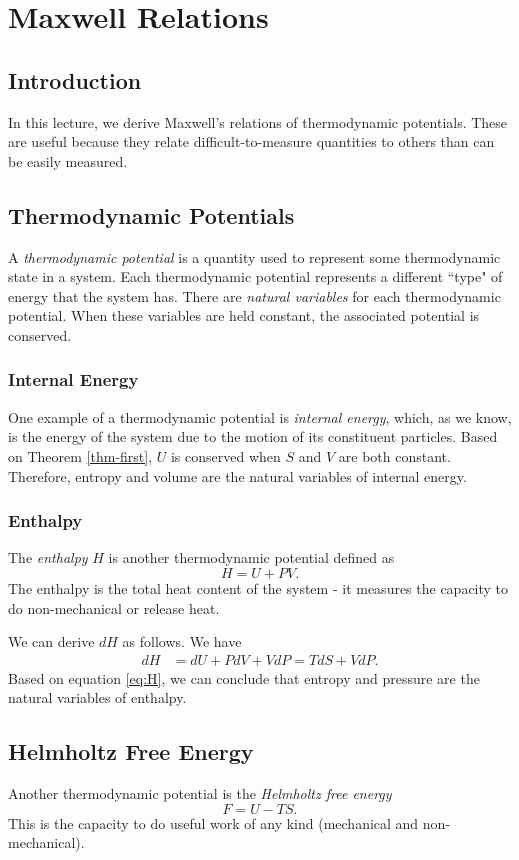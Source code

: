 \section {Maxwell Relations}
\subsection{Introduction} In this lecture, we derive Maxwell's relations of thermodynamic potentials. These are useful because they relate difficult-to-measure quantities to others than can be easily measured. 
\subsection{Thermodynamic Potentials}
A \textit{thermodynamic potential} is a quantity used to represent some thermodynamic state in a system. Each thermodynamic potential represents a different ``type" of energy that the system has. There are \textit{natural variables} for each thermodynamic potential. When these variables are held constant, the associated potential is conserved.
\subsubsection{Internal Energy}
One example of a thermodynamic potential is \textit{internal energy}, which, as we know, is the energy of the system due to the motion of its constituent particles. Based on Theorem \ref{thm-first}, $U$ is conserved when $S$ and $V$ are both constant. Therefore, entropy and volume are the natural variables of internal energy. 
\subsubsection{Enthalpy}
The \textit{enthalpy} $H$ is another thermodynamic potential defined as $$ H = U + PV.$$ The enthalpy is the total heat content of the system - it measures the capacity to do non-mechanical or release heat.
 
We can derive $dH$ as follows. We have
\begin{align}
dH &= dU + P dV + V dP 
= TdS + VdP. \label{eq:H}
\end{align} 
Based on equation \ref{eq:H}, we can conclude that entropy and pressure are the natural variables of enthalpy.
\subsection{Helmholtz Free Energy}
Another thermodynamic potential is the \textit{Helmholtz free energy} $$F = U-TS.$$ This is the capacity to do useful work of any kind (mechanical and non-mechanical).


